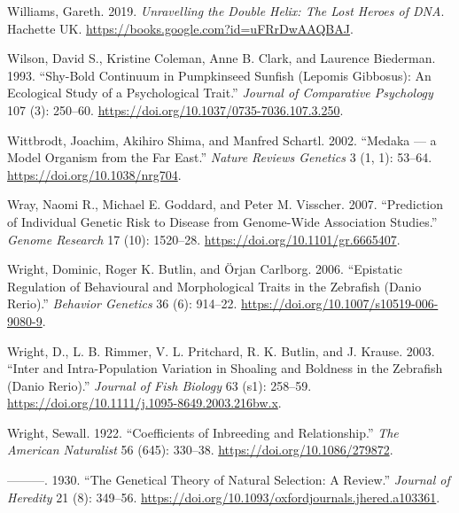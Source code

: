 \documentclass[
]{book}
\newlength{\cslhangindent}
\newlength{\cslentryspacingunit} %
\newenvironment{CSLReferences}[2] %
 {%
  \setlength{\parindent}{0pt}
  \ifodd #1
  \let\oldpar\par
  \def\par{\hangindent=\cslhangindent\oldpar}
  \fi
  \setlength{\parskip}{#2\cslentryspacingunit}
 }%
 {}
\begin{document}
\begin{CSLReferences}{1}{0}
\leavevmode{}%
Williams, Gareth. 2019. \emph{Unravelling the {Double Helix}: {The Lost Heroes} of {DNA}}. {Hachette UK}. \url{https://books.google.com?id=uFRrDwAAQBAJ}.

\leavevmode{}%
Wilson, David S., Kristine Coleman, Anne B. Clark, and Laurence Biederman. 1993. {``Shy-Bold Continuum in Pumpkinseed Sunfish ({Lepomis} Gibbosus): {An} Ecological Study of a Psychological Trait.''} \emph{Journal of Comparative Psychology} 107 (3): 250--60. \url{https://doi.org/10.1037/0735-7036.107.3.250}.

\leavevmode{}%
Wittbrodt, Joachim, Akihiro Shima, and Manfred Schartl. 2002. {``Medaka --- a Model Organism from the Far East.''} \emph{Nature Reviews Genetics} 3 (1, 1): 53--64. \url{https://doi.org/10.1038/nrg704}.

\leavevmode{}%
Wray, Naomi R., Michael E. Goddard, and Peter M. Visscher. 2007. {``Prediction of Individual Genetic Risk to Disease from Genome-Wide Association Studies.''} \emph{Genome Research} 17 (10): 1520--28. \url{https://doi.org/10.1101/gr.6665407}.

\leavevmode{}%
Wright, Dominic, Roger K. Butlin, and Örjan Carlborg. 2006. {``Epistatic Regulation of Behavioural and Morphological Traits in the Zebrafish ({Danio} Rerio).''} \emph{Behavior Genetics} 36 (6): 914--22. \url{https://doi.org/10.1007/s10519-006-9080-9}.

\leavevmode{}%
Wright, D., L. B. Rimmer, V. L. Pritchard, R. K. Butlin, and J. Krause. 2003. {``Inter and Intra-Population Variation in Shoaling and Boldness in the Zebrafish ({Danio} Rerio).''} \emph{Journal of Fish Biology} 63 (s1): 258--59. \url{https://doi.org/10.1111/j.1095-8649.2003.216bw.x}.

\leavevmode{}%
Wright, Sewall. 1922. {``Coefficients of {Inbreeding} and {Relationship}.''} \emph{The American Naturalist} 56 (645): 330--38. \url{https://doi.org/10.1086/279872}.

\leavevmode{}%
---------. 1930. {``The {Genetical Theory} of {Natural Selection}: {A Review}.''} \emph{Journal of Heredity} 21 (8): 349--56. \url{https://doi.org/10.1093/oxfordjournals.jhered.a103361}.


\end{CSLReferences}
\end{document}
